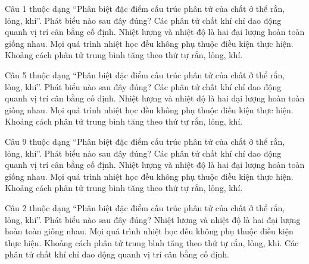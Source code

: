 \begin{ex}
Câu 1 thuộc dạng “Phân biệt đặc điểm cấu trúc phân tử của chất ở thể rắn, lỏng, khí”. Phát biểu nào sau đây đúng?
\choice
{Các phân tử chất khí chỉ dao động quanh vị trí cân bằng cố định.}
{Nhiệt lượng và nhiệt độ là hai đại lượng hoàn toàn giống nhau.}
{Mọi quá trình nhiệt học đều không phụ thuộc điều kiện thực hiện.}
{\True Khoảng cách phân tử trung bình tăng theo thứ tự rắn, lỏng, khí.}
\end{ex}

\begin{ex}
Câu 5 thuộc dạng “Phân biệt đặc điểm cấu trúc phân tử của chất ở thể rắn, lỏng, khí”. Phát biểu nào sau đây đúng?
\choice
{Các phân tử chất khí chỉ dao động quanh vị trí cân bằng cố định.}
{Nhiệt lượng và nhiệt độ là hai đại lượng hoàn toàn giống nhau.}
{Mọi quá trình nhiệt học đều không phụ thuộc điều kiện thực hiện.}
{\True Khoảng cách phân tử trung bình tăng theo thứ tự rắn, lỏng, khí.}
\end{ex}

\begin{ex}
Câu 9 thuộc dạng “Phân biệt đặc điểm cấu trúc phân tử của chất ở thể rắn, lỏng, khí”. Phát biểu nào sau đây đúng?
\choice
{Các phân tử chất khí chỉ dao động quanh vị trí cân bằng cố định.}
{Nhiệt lượng và nhiệt độ là hai đại lượng hoàn toàn giống nhau.}
{Mọi quá trình nhiệt học đều không phụ thuộc điều kiện thực hiện.}
{\True Khoảng cách phân tử trung bình tăng theo thứ tự rắn, lỏng, khí.}
\end{ex}

\begin{ex}
Câu 2 thuộc dạng “Phân biệt đặc điểm cấu trúc phân tử của chất ở thể rắn, lỏng, khí”. Phát biểu nào sau đây đúng?
\choice
{Nhiệt lượng và nhiệt độ là hai đại lượng hoàn toàn giống nhau.}
{Mọi quá trình nhiệt học đều không phụ thuộc điều kiện thực hiện.}
{\True Khoảng cách phân tử trung bình tăng theo thứ tự rắn, lỏng, khí.}
{Các phân tử chất khí chỉ dao động quanh vị trí cân bằng cố định.}
\end{ex}

